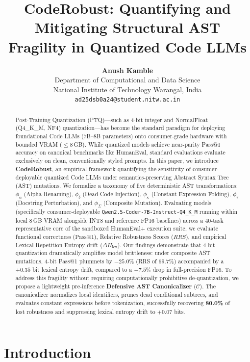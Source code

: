 \documentclass[11pt,twocolumn]{article}
\title{\textbf{CodeRobust: Quantifying and Mitigating Structural AST Fragility in Quantized Code LLMs}}
\author{
  \textbf{Anush Kamble} \\
  Department of Computational and Data Science \\
  National Institute of Technology Warangal, India \\
  \texttt{ad25dsb0a24@student.nitw.ac.in}
}
\date{}
\begin{document}
\maketitle

\begin{abstract}
Post-Training Quantization (PTQ)---such as 4-bit integer and NormalFloat (Q4\_K\_M, NF4) quantization---has become the standard paradigm for deploying foundational Code LLMs (7B--8B parameters) onto consumer-grade hardware with bounded VRAM ($\le 8$\,GB). While quantized models achieve near-parity Pass@1 accuracy on canonical benchmarks like HumanEval, standard evaluations evaluate exclusively on clean, conventionally styled prompts. In this paper, we introduce \textbf{CodeRobust}, an empirical framework quantifying the sensitivity of consumer-deployable quantized Code LLMs under semantics-preserving Abstract Syntax Tree (AST) mutations. We formalize a taxonomy of five deterministic AST transformations: $\phi_\alpha$ (Alpha-Renaming), $\phi_\delta$ (Dead-Code Injection), $\phi_\kappa$ (Constant Expression Folding), $\phi_\tau$ (Docstring Perturbation), and $\phi_\Sigma$ (Composite Mutation). Evaluating models (specifically consumer-deployable \texttt{Qwen2.5-Coder-7B-Instruct-Q4\_K\_M} running within local 8\,GB VRAM alongside INT8 and reference FP16 baselines) across a 40-task representative core of the sandboxed HumanEval+ execution suite, we evaluate functional correctness ($\text{Pass@1}$), Relative Robustness Scores ($RRS$), and empirical Lexical Repetition Entropy drift ($\Delta H_{\text{lex}}$). Our findings demonstrate that 4-bit quantization dramatically amplifies model brittleness: under composite AST mutations, 4-bit Pass@1 plummets by \textbf{$-25.0\%$} (RRS of $69.7\%$) accompanied by a $+0.35$ bit lexical entropy drift, compared to a $-7.5\%$ drop in full-precision FP16. To address this fragility without requiring computationally prohibitive de-quantization, we propose a lightweight pre-inference \textbf{Defensive AST Canonicalizer} ($\mathcal{C}$). The canonicalizer normalizes local identifiers, prunes dead conditional subtrees, and evaluates constant expressions before tokenization, successfully recovering \textbf{80.0\%} of lost robustness and suppressing lexical entropy drift to $+0.07$ bits.
\end{abstract}

\section{Introduction}
\label{sec:intro}
\end{document}
